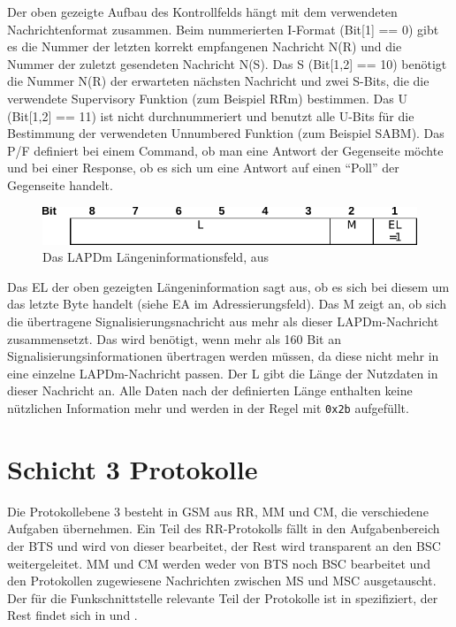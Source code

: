 Der oben gezeigte Aufbau des Kontrollfelds hängt mit dem verwendeten Nachrichtenformat zusammen. Beim nummerierten \ac{I}-Format (Bit[1] == 0) gibt es die Nummer der letzten korrekt empfangenen Nachricht \ac{N(R)} und die Nummer der zuletzt gesendeten Nachricht \ac{N(S)}. Das \ac{S} (Bit[1,2] == 10) benötigt die Nummer \ac{N(R)} der erwarteten nächsten Nachricht und zwei S-Bits, die die verwendete Supervisory Funktion (zum Beispiel \ac{RRm}) bestimmen. Das \ac{U} (Bit[1,2] == 11) ist nicht durchnummeriert und benutzt alle U-Bits für die Bestimmung der verwendeten Unnumbered Funktion (zum Beispiel \ac{SABM}). Das \ac{P/F} definiert bei einem Command, ob man eine Antwort der Gegenseite möchte und bei einer Response, ob es sich um eine Antwort auf einen "`Poll"' der Gegenseite handelt.

\begin{figure}[H]
	\centering \includegraphics[width=0.9\linewidth]{figures/0406_fig_5.pdf}
	\caption[Das LAPDm Längeninformationsfeld]{Das \ac{LAPDm} Längeninformationsfeld, aus \citep[Abb. 5]{3gpp:04.06}} \label{fig:lapdm-format-len}
\end{figure}

Das \ac{EL} der oben gezeigten Längeninformation sagt aus, ob es sich bei diesem um das letzte Byte handelt (siehe \ac{EA} im Adressierungsfeld). Das \ac{M} zeigt an, ob sich die übertragene Signalisierungsnachricht aus mehr als dieser \ac{LAPDm}-Nachricht zusammensetzt. Das wird benötigt, wenn mehr als 160 Bit an Signalisierungsinformationen übertragen werden müssen, da diese nicht mehr in eine einzelne \ac{LAPDm}-Nachricht passen. Der \ac{L} gibt die Länge der Nutzdaten in dieser Nachricht an. Alle Daten nach der definierten Länge enthalten keine nützlichen Information mehr und werden in der Regel mit \texttt{0x2b} aufgefüllt.

\section{Schicht 3 Protokolle}

Die Protokollebene 3 besteht in \ac{GSM} aus \acf{RR}, \acf{MM} und \acf{CM}, die verschiedene Aufgaben übernehmen. Ein Teil des \ac{RR}-Protokolls fällt in den Aufgabenbereich der \ac{BTS} und wird von dieser bearbeitet, der Rest wird transparent an den \ac{BSC} weitergeleitet. \ac{MM} und \ac{CM} werden weder von \ac{BTS} noch \ac{BSC} bearbeitet und den Protokollen zugewiesene Nachrichten zwischen \ac{MS} und \ac{MSC} ausgetauscht. Der für die Funkschnittstelle relevante Teil der Protokolle ist in  spezifiziert, der Rest findet sich in  und .

